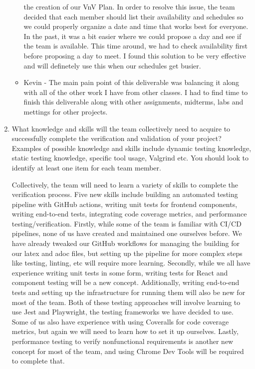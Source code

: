 \documentclass[12pt, titlepage]{article}
\begin{document}
\begin{enumerate}
\begin{itemize}
      the creation of our VnV Plan. In order to resolve this issue, the team
      decided that each member should list their availability and schedules
      so we could properly organize a date and time that works best for
      everyone. In the past, it was a bit easier where we could
      propose a day and see if the team is available. This time around, we
      had to check availability first before proposing a day to meet. I found
      this solution to be very effective and will definetely use this
      when our schedules get busier.
    \item Kevin - The main pain point of this deliverable was balancing it along with all of the other work I
    have from other classes. I had to find time to finish this deliverable along with other assignments,
    midterms, labs and mettings for other projects.
  \end{itemize}
  \item What knowledge and skills will the team collectively need to acquire to
  successfully complete the verification and validation of your project?
  Examples of possible knowledge and skills include dynamic testing knowledge,
  static testing knowledge, specific tool usage, Valgrind etc.  You should look to
  identify at least one item for each team member.

    Collectively, the team will need to learn a variety of skills to complete
    the verification process. Five new skills include building an automated
    testing pipeline with GitHub actions, writing unit tests for frontend
    components, writing end-to-end tests, integrating code coverage metrics,
    and performance testing/verification. Firstly, while some of the team is
    familiar with CI/CD pipelines, none of us have created and maintained one
    ourselves before. We have already tweaked our GitHub workflows for managing
    the building for our latex and adoc files, but setting up the pipeline for
    more complex steps like testing, linting, etc will require more learning.
    Secondly, while we all have experience writing unit tests in some form,
    writing tests for React and component testing will be a new concept.
    Additionally, writing end-to-end tests and setting up the infrastructure
    for running them will also be new for most of the team. Both of these
    testing approaches will involve learning to use Jest and Playwright, the
    testing frameworks we have decided to use. Some of us also have experience
    with using Coveralls for code coverage metrics, but again we will need to
    learn how to set it up ourselves. Lastly, performance testing to verify
    nonfunctional requirements is another new concept for most of the team, and
    using Chrome Dev Tools will be required to complete that.


\end{enumerate}
\end{document}

